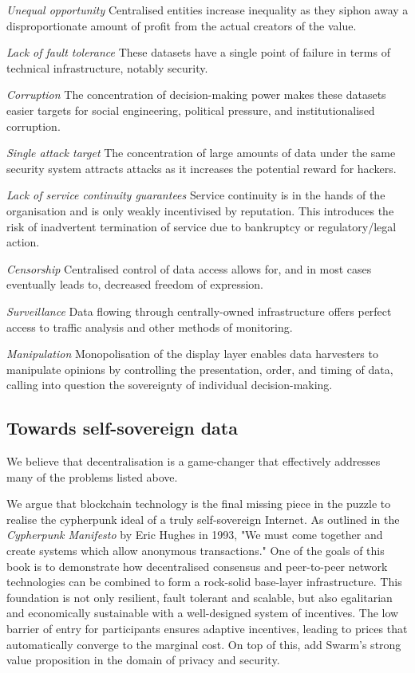 \begin{labelledlist}
    \item[\emph{Unequal opportunity}] Centralised entities increase inequality as they siphon away a disproportionate amount of profit from the actual creators of the value.
    \item[\emph{Lack of fault tolerance}] These datasets have a single point of failure in terms of technical infrastructure, notably security.
    \item[\emph{Corruption}] The concentration of decision-making power makes these datasets easier targets for social engineering, political pressure, and institutionalised corruption.
    \item[\emph{Single attack target}] The concentration of large amounts of data under the same security system attracts attacks as it increases the potential reward for hackers. 
    \item[\emph{Lack of service continuity guarantees}] Service continuity is in the hands of the organisation and is only weakly incentivised by reputation. This introduces the risk of inadvertent termination of service due to bankruptcy or regulatory/legal action.
    \item[\emph{Censorship}] Centralised control of data access allows for, and in most cases eventually leads to, decreased freedom of expression.
    \item[\emph{Surveillance}] Data flowing through centrally-owned infrastructure offers perfect access to traffic analysis and other methods of monitoring.
    \item[\emph{Manipulation}] Monopolisation of the display layer enables data harvesters to manipulate opinions by controlling the presentation, order, and timing of data, calling into question the sovereignty of individual decision-making.
\end{labelledlist}


\subsection{Towards self-sovereign data \statusgreen} \label{sec:selfsovereigndata}

We believe that decentralisation is a game-changer that effectively addresses many of the problems listed above.

We argue that blockchain technology is the final missing piece in the puzzle to realise the cypherpunk ideal of a truly self-sovereign Internet. As outlined in the \emph{Cypherpunk Manifesto} \cite{hughes1993} by Eric Hughes in 1993, "We must come together and create systems which allow anonymous transactions." One of the goals of this book is to demonstrate how decentralised consensus and peer-to-peer network technologies can be combined to form a rock-solid base-layer infrastructure. This foundation is not only resilient, fault tolerant and scalable, but also egalitarian and economically sustainable with a well-designed system of incentives. The low barrier of entry for participants ensures adaptive incentives, leading to prices that 
 automatically converge to the marginal cost. On top of this, add Swarm's strong value proposition in the domain of privacy and security.

